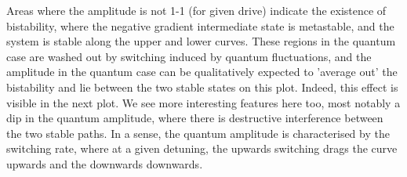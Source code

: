 Areas where the amplitude is not 1-1 (for given drive) indicate the existence of bistability, where the negative gradient intermediate state is metastable, and the system is stable along the upper and lower curves. These regions in the quantum case are washed out by switching induced by quantum fluctuations, and the amplitude in the quantum case can be qualitatively expected to 'average out' the bistability and lie between the two stable states on this plot. Indeed, this effect is visible in the next plot. We see more interesting features here too, most notably a dip in the quantum amplitude, where there is destructive interference between the two stable paths. In a sense, the quantum amplitude is characterised by the switching rate, where at a given detuning, the upwards switching drags the curve upwards and the downwards downwards.

